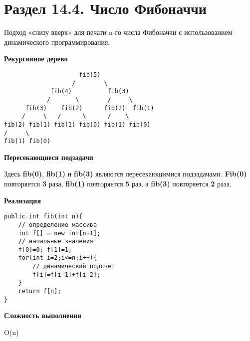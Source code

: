 \section*{Раздел 14.4. Число Фибоначчи}

\vspace{\baselineskip}
Подход «снизу вверх» для печати n-го числа Фибоначчи с использованием динамического программирования.

\vspace{\baselineskip}
\textbf{Рекурсивное дерево}

\vspace{\baselineskip}
\begin{tcolorbox}
\begin{verbatim}
                     fib(5)
                   /        \
             fib(4)          fib(3)
            /       \        /     \
      fib(3)    fib(2)      fib(2)  fib(1)
     /     \   /      \      /    \
fib(2) fib(1) fib(1) fib(0) fib(1) fib(0)
/     \
fib(1) fib(0)

\end{verbatim}
\end{tcolorbox}

\vspace{\baselineskip}
\textbf{Пересекающиеся подзадачи}

\vspace{\baselineskip}
Здесь \textbf{fib(0)}, \textbf{fib(1)} и \textbf{fib(3)} являются пересекающимися подзадачами. \textbf{Fib(0)} повторяется \textbf{3} раза, \textbf{fib(1)} повторяется \textbf{5} раз, а \textbf{fib(3)} повторяется \textbf{2} раза. 

\vspace{\baselineskip}
\textbf{Реализация}

\vspace{\baselineskip}
\begin{tcolorbox}
\begin{verbatim}
public int fib(int n){
	// определение массива
	int f[] = new int[n+1];
	// начальные значения
	f[0]=0; f[1]=1;
	for(int i=2;i<=n;i++){
		// динамический подсчет
		f[i]=f[i-1]+f[i-2];
	}
	return f[n];
}
\end{verbatim}
\end{tcolorbox}

\vspace{\baselineskip}
\textbf{Сложность выполнения}

\vspace{\baselineskip}
O(n) 

